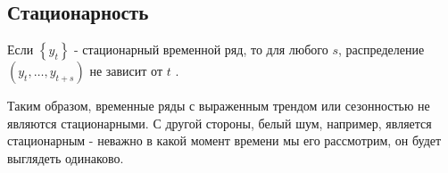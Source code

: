 





\subsection{Стационарность}

Если $\left\{y_t\right\}$ - стационарный временной ряд, то 
для любого $s$, распределение $(y_t, \dots, y_{t+s})$ не зависит 
от $t$ \cite{Forecasting_Hyndman}. 

Таким образом, временные ряды с выраженным трендом или сезонностью не являются стационарными.
С другой стороны, белый шум, например, является стационарным - неважно в какой момент времени 
мы его рассмотрим, он будет выглядеть одинаково.

